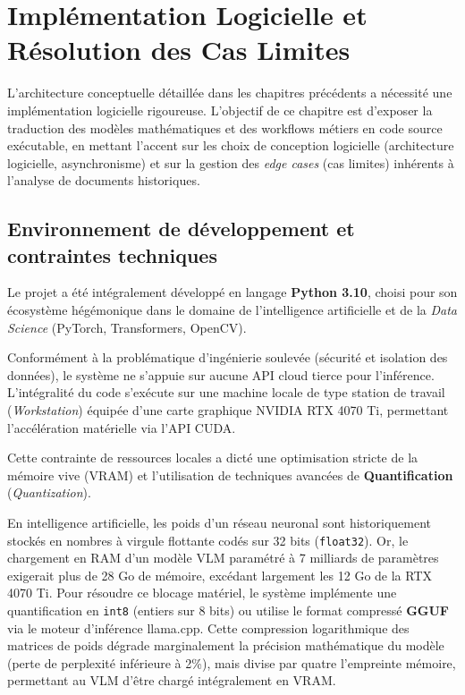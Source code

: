 \section{Implémentation Logicielle et Résolution des Cas Limites}
\label{sec:implementation}

L'architecture conceptuelle détaillée dans les chapitres précédents a nécessité une implémentation logicielle rigoureuse. L'objectif de ce chapitre est d'exposer la traduction des modèles mathématiques et des workflows métiers en code source exécutable, en mettant l'accent sur les choix de conception logicielle (architecture logicielle, asynchronisme) et sur la gestion des \textit{edge cases} (cas limites) inhérents à l'analyse de documents historiques.

\subsection{Environnement de développement et contraintes techniques}

Le projet a été intégralement développé en langage \textbf{Python 3.10}, choisi pour son écosystème hégémonique dans le domaine de l'intelligence artificielle et de la \textit{Data Science} (PyTorch, Transformers, OpenCV). 

Conformément à la problématique d'ingénierie soulevée (sécurité et isolation des données), le système ne s'appuie sur aucune API cloud tierce pour l'inférence. L'intégralité du code s'exécute sur une machine locale de type station de travail (\textit{Workstation}) équipée d'une carte graphique NVIDIA RTX 4070 Ti, permettant l'accélération matérielle via l'API CUDA.

Cette contrainte de ressources locales a dicté une optimisation stricte de la mémoire vive (VRAM) et l'utilisation de techniques avancées de \textbf{Quantification} (\textit{Quantization}). 

En intelligence artificielle, les poids d'un réseau neuronal sont historiquement stockés en nombres à virgule flottante codés sur 32 bits (\texttt{float32}). Or, le chargement en RAM d'un modèle VLM paramétré à 7 milliards de paramètres exigerait plus de 28 Go de mémoire, excédant largement les 12 Go de la RTX 4070 Ti.
Pour résoudre ce blocage matériel, le système implémente une quantification en \texttt{int8} (entiers sur 8 bits) ou utilise le format compressé \textbf{GGUF} via le moteur d'inférence llama.cpp. Cette compression logarithmique des matrices de poids dégrade marginalement la précision mathématique du modèle (perte de perplexité inférieure à 2\%), mais divise par quatre l'empreinte mémoire, permettant au VLM d'être chargé intégralement en VRAM.

